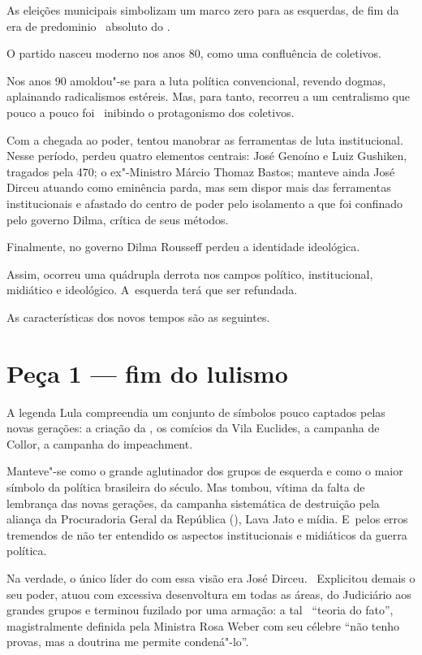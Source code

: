  

As eleições municipais simbolizam um marco zero para as esquerdas, de
fim da era de predominio ~absoluto do .~

O partido nasceu moderno nos anos 80, como uma confluência de
coletivos.~

Nos anos 90 amoldou"-se para a luta política convencional, revendo
dogmas, aplainando radicalismos estéreis. Mas, para tanto, recorreu a um
centralismo que pouco a pouco foi~ inibindo o protagonismo dos
coletivos.~

Com a chegada ao poder, tentou manobrar as ferramentas de luta
institucional. Nesse período, perdeu quatro elementos centrais: José
Genoíno e Luiz Gushiken, tragados pela  470; o ex"-Ministro Márcio
Thomaz Bastos; manteve ainda José Dirceu atuando como eminência parda,
mas sem dispor mais das ferramentas institucionais e afastado do centro
de poder pelo isolamento a que foi confinado pelo governo Dilma, crítica
de seus métodos.~

Finalmente, no governo Dilma Rousseff perdeu a identidade ideológica.

Assim, ocorreu uma quádrupla derrota nos campos político, institucional,
midiático e ideológico. A~esquerda terá que ser refundada.

As características dos novos tempos são as seguintes.

\section{Peça 1 --- fim do lulismo}

A legenda Lula compreendia um conjunto de símbolos pouco captados pelas
novas gerações: a criação da , os comícios da Vila Euclides, a
campanha de Collor, a campanha do impeachment.

Manteve"-se como o grande aglutinador dos grupos de esquerda e como o
maior símbolo da política brasileira do século. Mas tombou, vítima da
falta de lembrança das novas gerações, da campanha sistemática de
destruição pela aliança da Procuradoria Geral da República (), Lava
Jato e mídia. E~pelos erros tremendos de não ter entendido os aspectos
institucionais e midiáticos da guerra política.

Na verdade, o único líder do  com essa visão era José Dirceu.~
Explicitou demais o seu poder, atuou com excessiva desenvoltura em todas
as áreas, do Judiciário aos grandes grupos e terminou fuzilado por uma
armação: a tal~ ``teoria do fato'', magistralmente definida pela
Ministra Rosa Weber com seu célebre ``não tenho provas, mas a doutrina
me permite condená"-lo''.

